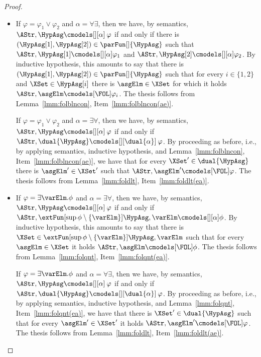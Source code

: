 \documentclass[authoryear]{elsarticle}
\begin{document}
\begin{proof}
\begin{itemize}
  \item If $\varphi = \varphi_1 \vee\varphi_2$ and $\alpha = \forall\exists$,
    then we have, by semantics, $\AStr, \HypAsg \cmodels[][\alpha]\: \varphi$ if
    and only if there is $(\HypAsg[1], \HypAsg[2]) \in \parFun[]{\HypAsg}$ such
    that $\AStr, \HypAsg[1] \cmodels[][\alpha] \varphi_{1}$ and $\AStr,
    \HypAsg[2] \cmodels[][\alpha] \varphi_{2}$.
    By inductive hypothesis, this amounts to say that there is $(\HypAsg[1],
    \HypAsg[2]) \in \parFun[]{\HypAsg}$ such that for every $i \in \{ 1,2 \}$
    and $\XSet \in \HypAsg[i]$ there is $\asgElm \in \XSet$ for which it holds
    $\AStr, \asgElm \cmodels[\FOL]\varphi_{i}$.
    The thesis follows from Lemma~\ref{lmm:folblncon},
    Item~\ref{lmm:folblncon(ae)}.

    If $\varphi = \varphi_1 \vee\varphi_2$ and $\alpha = \exists\forall$, then
    we have, by semantics, $\AStr, \HypAsg \cmodels[][\alpha]\: \varphi$ if and
    only if $\AStr, \dual{\HypAsg} \cmodels[][\dual{\alpha}]\: \varphi$.
    By proceeding as before, i.e., by applying semantics, inductive hypothesis,
    and Lemma~\ref{lmm:folblncon}, Item~\ref{lmm:folblncon(ae)}, we have that
    for every $\XSet' \in \dual{\HypAsg}$ there is $\asgElm' \in \XSet'$ such
    that $\AStr, \asgElm' \cmodels[\FOL]\varphi$.
    The thesis follows from Lemma~\ref{lmm:foldlt}, Item~\ref{lmm:foldlt(ea)}.

  \item If $\varphi = \exists \varElm . \phi$ and $\alpha = \exists\forall$,
    then we have, by semantics, $\AStr, \HypAsg \cmodels[][\alpha]\: \varphi$ if
    and only if $\AStr, \extFun[\sup{\phi} \setminus \{ \varElm \}]{\HypAsg,
      \varElm} \cmodels[][\alpha] \phi$.
    By inductive hypothesis, this amounts to say that there is $\XSet \in
    \extFun[\sup{\phi} \setminus \{ \varElm \}]{\HypAsg, \varElm}$ such that for
    every $\asgElm \in \XSet$ it holds $\AStr, \asgElm \cmodels[\FOL]\phi$.
    The thesis follows from Lemma~\ref{lmm:folqnt}, Item~\ref{lmm:folqnt(ea)}.

    If $\varphi = \exists \varElm . \phi$ and $\alpha = \forall\exists$, then we
    have, by semantics, $\AStr, \HypAsg \cmodels[][\alpha]\: \varphi$ if and
    only if $\AStr, \dual{\HypAsg} \cmodels[][\dual{\alpha}]\: \varphi$.
    By proceeding as before, i.e., by applying semantics, inductive hypothesis,
    and Lemma~\ref{lmm:folqnt}, Item~\ref{lmm:folqnt(ea)}, we have that there is
    $\XSet' \in \dual{\HypAsg}$ such that for every $\asgElm' \in \XSet'$ it
    holds $\AStr, \asgElm' \cmodels[\FOL]\varphi$.
    The thesis follows from Lemma~\ref{lmm:foldlt}, Item~\ref{lmm:foldlt(ae)}.


\end{itemize}
\end{proof}
\end{document}
